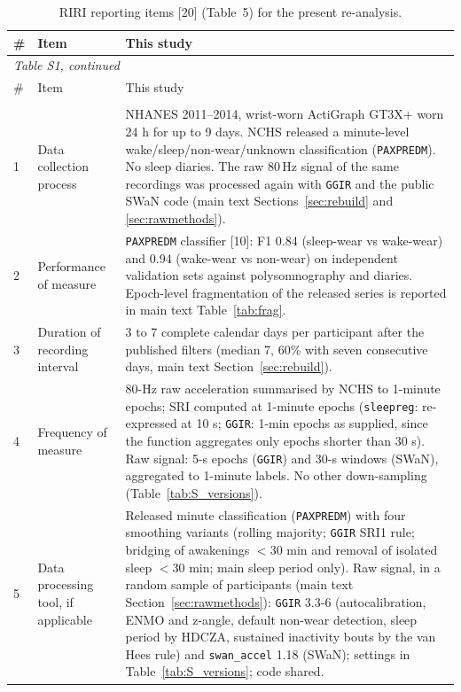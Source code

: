 {\footnotesize\setlength{\tabcolsep}{4pt}
\begin{longtable}{p{}p{}p{}}
\caption{RIRI reporting items [20] (Table~5) for the present re-analysis.}
\label{tab:riri}\\
\toprule
\# & Item & This study \\
\midrule
\endfirsthead
\multicolumn{3}{l}{\emph{Table S1, continued}}\\
\toprule
\# & Item & This study \\
\midrule
\endhead
\bottomrule
\endlastfoot
\multicolumn{3}{l}{\emph{Methods}} \\
1 & Data collection process & NHANES 2011--2014, wrist-worn ActiGraph GT3X+ worn 24 h for up to 9 days. NCHS released a minute-level wake/sleep/non-wear/unknown classification (\texttt{PAXPREDM}). No sleep diaries. The raw 80\,Hz signal of the same recordings was processed again with \texttt{GGIR} and the public SWaN code (main text Sections~\ref{sec:rebuild} and \ref{sec:rawmethods}). \\
2 & Performance of measure & \texttt{PAXPREDM} classifier [10]: F1 0.84 (sleep-wear vs wake-wear) and 0.94 (wake-wear vs non-wear) on independent validation sets against polysomnography and diaries. Epoch-level fragmentation of the released series is reported in main text Table~\ref{tab:frag}. \\
3 & Duration of recording interval & 3 to 7 complete calendar days per participant after the published filters (median 7, 60\% with seven consecutive days, main text Section~\ref{sec:rebuild}). \\
4 & Frequency of measure & 80-Hz raw acceleration summarised by NCHS to 1-minute epochs; SRI computed at 1-minute epochs (\texttt{sleepreg}: re-expressed at 10 s; \texttt{GGIR}: 1-min epochs as supplied, since the function aggregates only epochs shorter than 30 s). Raw signal: 5-s epochs (\texttt{GGIR}) and 30-s windows (SWaN), aggregated to 1-minute labels. No other down-sampling (Table~\ref{tab:S_versions}). \\
5 & Data processing tool, if applicable & Released minute classification (\texttt{PAXPREDM}) with four smoothing variants (rolling majority; \texttt{GGIR} SRI1 rule; bridging of awakenings $<$30 min and removal of isolated sleep $<$30 min; main sleep period only). Raw signal, in a random sample of \rawPrefixR{} participants (main text Section~\ref{sec:rawmethods}): \texttt{GGIR} 3.3-6 (autocalibration, ENMO and z-angle, default non-wear detection, sleep period by HDCZA, sustained inactivity bouts by the van Hees rule) and \texttt{swan\_accel} 1.18 (SWaN); settings in Table~\ref{tab:S_versions}; code shared. \\

\end{longtable}}
